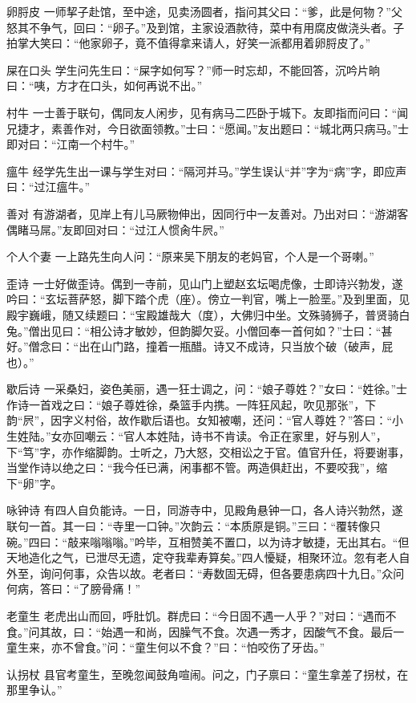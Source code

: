 \documentclass[12pt,UTF8]{ctexbook}
\begin{document}
卵脟皮
一师挈子赴馆，至中途，见卖汤圆者，指问其父曰：“爹，此是何物？”父怒其不争气，回曰：“卵子。”及到馆，主家设酒款待，菜中有用腐皮做浇头者。子拍掌大笑曰：“他家卵子，竟不值得拿来请人，好笑一派都用着卵脟皮了。”

屎在口头
学生问先生曰：“屎字如何写？”师一时忘却，不能回答，沉吟片晌曰：“咦，方才在口头，如何再说不出。”

村牛
一士善于联句，偶同友人闲步，见有病马二匹卧于城下。友即指而问曰：“闻兄捷才，素善作对，今日欲面领教。”士曰：“愿闻。”友出题曰：“城北两只病马。”士即对曰：“江南一个村牛。”

瘟牛
经学先生出一课与学生对曰：“隔河并马。”学生误认“并”字为“病”字，即应声曰：“过江瘟牛。”

善对
有游湖者，见岸上有儿马厥物伸出，因同行中一友善对。乃出对曰：“游湖客偶睹马屌。”友即回对曰：“过江人惯肏牛屄。”

个人个妻
一上路先生向人问：“原来吴下朋友的老妈官，个人是一个哥喇。”

歪诗
一士好做歪诗。偶到一寺前，见山门上塑赵玄坛喝虎像，士即诗兴勃发，遂吟曰：“玄坛菩萨怒，脚下踏个虎（座）。傍立一判官，嘴上一脸垩。”及到里面，见殿宇巍峨，随又续题曰：“宝殿雄哉大（度），大佛归中坐。文殊骑狮子，普贤骑白兔。”僧出见曰：“相公诗才敏妙，但韵脚欠妥。小僧回奉一首何如？”士曰：“甚好。”僧念曰：“出在山门路，撞着一瓶醋。诗又不成诗，只当放个破（破声，屁也）。”

歇后诗
一采桑妇，姿色美丽，遇一狂士调之，问：“娘子尊姓？”女曰：“姓徐。”士作诗一首戏之曰：“娘子尊姓徐，桑篮手内携。一阵狂风起，吹见那张”，下韵“屄”，因字义村俗，故作歇后语也。女知被嘲，还问：“官人尊姓？”答曰：“小生姓陆。”女亦回嘲云：“官人本姓陆，诗书不肯读。令正在家里，好与别人”，下“笃”字，亦作缩脚韵。士听之，乃大怒，交相讼之于官。值官升任，将要谢事，当堂作诗以绝之曰：“我今任已满，闲事都不管。两造俱赶出，不要咬我”，缩下“卵”字。

咏钟诗
有四人自负能诗。一日，同游寺中，见殿角悬钟一口，各人诗兴勃然，遂联句一首。其一曰：“寺里一口钟。”次韵云：“本质原是铜。”三曰：“覆转像只碗。”四曰：“敲来嗡嗡嗡。”吟毕，互相赞美不置口，以为诗才敏捷，无出其右。“但天地造化之气，已泄尽无遗，定夺我辈寿算矣。”四人懮疑，相聚环泣。忽有老人自外至，询问何事，众告以故。老者曰：“寿数固无碍，但各要患病四十九日。”众问何病，答曰：“了膀骨痛！”

老童生
老虎出山而回，呼肚饥。群虎曰：“今日固不遇一人乎？”对曰：“遇而不食。”问其故，曰：“始遇一和尚，因臊气不食。次遇一秀才，因酸气不食。最后一童生来，亦不曾食。”问：“童生何以不食？”曰：“怕咬伤了牙齿。”

认拐杖
县官考童生，至晚忽闻鼓角喧闹。问之，门子禀曰：“童生拿差了拐杖，在那里争认。”
\end{document}
